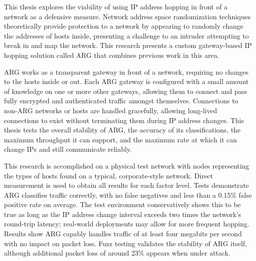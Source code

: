 \acresetall

\par This thesis explores the viability of using \ac{IP} address hopping in front of a network as a defensive measure. Network address space randomization techniques theoretically provide protection to a network by appearing to randomly change the addresses of hosts inside, presenting a challenge to an intruder attempting to break in and map the network. This research presents a custom gateway-based \ac{IP} hopping solution called \ac{ARG} that combines previous work in this area.

\par \ac{ARG} works as a transparent gateway in front of a network, requiring no changes to the hosts inside or out. Each \ac{ARG} gateway is configured with a small amount of knowledge on one or more other gateways, allowing them to connect and pass fully encrypted and authenticated traffic amongst themselves. Connections to non-\ac{ARG} networks or hosts are handled gracefully, allowing long-lived connections to exist without terminating them during \ac{IP} address changes. This thesis tests the overall stability of \ac{ARG}, the accuracy of its classifications, the maximum throughput it can support, and the maximum rate at which it can change \acp{IP} and still communicate reliably.

\par This research is accomplished on a physical test network with nodes representing the types of hosts found on a typical, corporate-style network. Direct measurement is used to obtain all results for each factor level. Tests demonstrate \ac{ARG} classifies traffic correctly, with no false negatives and less than a 0.15\% false positive rate on average. The test environment conservatively shows this to be true as long as the \ac{IP} address change interval exceeds two times the network's round-trip latency; real-world deployments may allow for more frequent hopping. Results show \ac{ARG} capably handles traffic of at least four megabits per second with no impact on packet loss. Fuzz testing validates the stability of \ac{ARG} itself, although additional packet loss of around 23\% appears when under attack.

\acresetall

